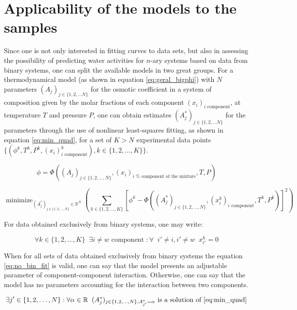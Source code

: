 \documentclass[
	12pt,				%
	openright,
	twoside,
	a4paper,			%
	brazil,			%
	french,				%
	english				%
	]{abntex2}
\DeclareMathOperator*{\minimize}{minimize}
\begin{document}
\section{Applicability of the models to the samples}

Since one is not only interested in fitting curves to data sets, but also in
assessing the possibility of predicting water activities for $n$-ary systems
based on data from binary systems, one can split the available models in two
great groups. For a thermodynamical model (as shown in equation
\ref{eq:geral_bigphi}) with $N$ parameters $(A_j)_{j \in \{1, 2, \ldots N\}}$
for the osmotic coefficient in a system of composition given by the molar
fractions of each component $(x_i)_\text{$i$ component}$, at temperature $T$
and pressure $P$, one can obtain estimates $(A^*_j)_{j \in \{1, 2, \ldots N\}}$
for the parameters through the use of nonlinear least-squares fitting,
as shown in equation \ref{eq:min_quad}, for a set of $K > N$ experimental data
points
$\{(\phi^k, T^k, P^k, (x_i)^k_\text{$i$ component}), k \in \{1,2,\ldots,K\}\}$.

\begin{equation}
	\label{eq:geral_bigphi}
	\phi = \Phi((A_j)_{j \in \{1, 2, \ldots, N\}}, (x_i)_\text{$i$ %
		component of the mixture}, T, P)
\end{equation}

\begin{equation}
	\label{eq:min_quad}
	\minimize_{(A_j^*)_{j \in \{1,2,\ldots,N\}} \in \mathbb{R}^N}%
	\left(\sum_{k \in \{1,2,\ldots,K\}}\left[\phi^k - \Phi((A^*_j)_{j%
	\in \{1, 2, \ldots, N\}}, (x^k_i)_\text{$i$ component},%
	T^k, P^k)\right]^2\right)
\end{equation}

For data obtained exclusively from binary systems, one may write:

\begin{equation}
	\forall k \in \{1,2,\ldots,K\} \;\; \exists i \neq w%
	\text{ component } : \forall \;\; i' \neq i, i' \neq w\;\; x^k_{i'} = 0
\end{equation}

When for all sets of data obtained exclusively from binary systems the equation
\ref{eq:no_bin_fit} is valid, one can say that the model presents an adjustable
parameter of component-component interaction. Otherwise, one can say that the model
has no parameters accounting for the interaction between two components.

\begin{equation}
	\label{eq:no_bin_fit}
	\exists j' \in \{1,2,\ldots,N\} : \forall \alpha \in \mathbb{R}\;\;%
	(A_j^*)_{j \in \{1,2,\ldots,N\}, A_{j'}^* = \alpha}%
	\text{ is a solution of \ref{eq:min_quad}}
\end{equation}
\end{document}
